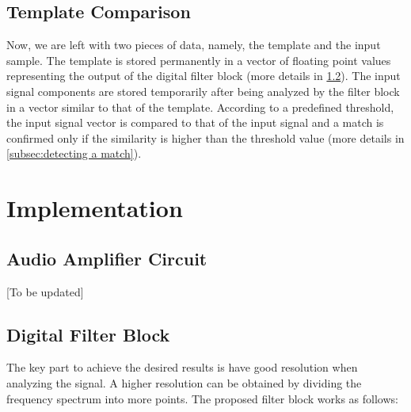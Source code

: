 \documentclass{article}
\begin{document}
	\subsection{Template Comparison}
	\label{subsec:template comparison}
	Now, we are left with two pieces of data, namely, the template and the input sample. The template is stored permanently in a vector of floating point values representing the output of the digital filter block (more details in \ref{subsec:digiatl filter block}). The input signal components are stored temporarily after being analyzed by the filter block in a vector similar to that of the template. According to a predefined threshold, the input signal vector is compared to that of the input signal and a match is confirmed only if the similarity is higher than the threshold value (more details in \ref{subsec:detecting a match}). 
	
	
	\section{Implementation}
	\label{sec:implementation}
	
	\subsection{Audio Amplifier Circuit}
	\label{subsec:audio amplifier circuit}
	[To be updated]
	
	\subsection{Digital Filter Block} 
	\label{subsec:digiatl filter block}
	
	The key part to achieve the desired results is have good resolution when analyzing the signal. A higher resolution can be obtained by dividing the frequency spectrum into more points. The proposed filter block works as follows: 
	
\end{document}
